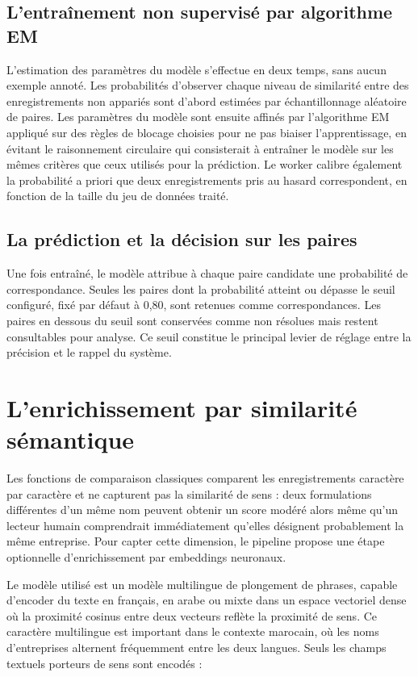 \subsection{L'entraînement non supervisé par algorithme EM}

L'estimation des paramètres du modèle s'effectue en deux temps, sans aucun exemple annoté. Les probabilités d'observer chaque niveau de similarité entre des enregistrements non appariés sont d'abord estimées par échantillonnage aléatoire de paires. Les paramètres du modèle sont ensuite affinés par l'algorithme EM appliqué sur des règles de blocage choisies pour ne pas biaiser l'apprentissage, en évitant le raisonnement circulaire qui consisterait à entraîner le modèle sur les mêmes critères que ceux utilisés pour la prédiction. Le worker calibre également la probabilité a priori que deux enregistrements pris au hasard correspondent, en fonction de la taille du jeu de données traité.

\subsection{La prédiction et la décision sur les paires}

Une fois entraîné, le modèle attribue à chaque paire candidate une probabilité de correspondance. Seules les paires dont la probabilité atteint ou dépasse le seuil configuré, fixé par défaut à 0,80, sont retenues comme correspondances. Les paires en dessous du seuil sont conservées comme non résolues mais restent consultables pour analyse. Ce seuil constitue le principal levier de réglage entre la précision et le rappel du système.

\section{L'enrichissement par similarité sémantique}

Les fonctions de comparaison classiques comparent les enregistrements caractère par caractère et ne capturent pas la similarité de sens : deux formulations différentes d'un même nom peuvent obtenir un score modéré alors même qu'un lecteur humain comprendrait immédiatement qu'elles désignent probablement la même entreprise. Pour capter cette dimension, le pipeline propose une étape optionnelle d'enrichissement par embeddings neuronaux.

Le modèle utilisé est un modèle multilingue de plongement de phrases, capable d'encoder du texte en français, en arabe ou mixte dans un espace vectoriel dense où la proximité cosinus entre deux vecteurs reflète la proximité de sens. Ce caractère multilingue est important dans le contexte marocain, où les noms d'entreprises alternent fréquemment entre les deux langues. Seuls les champs textuels porteurs de sens sont encodés :

